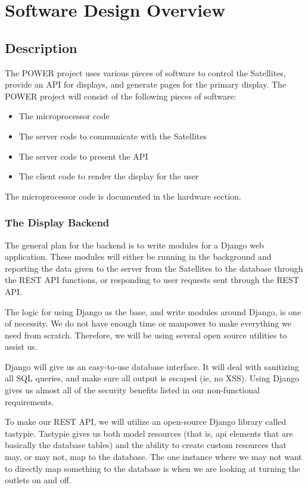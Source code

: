 
\chapter{Software Design Overview}

\section{Description}

The POWER project uses various pieces of software to control the Satellites, provide an API for displays, and generate pages for the primary display.
The POWER project will consist of the following pieces of software:
\begin{itemize}
 \item The microprocessor code
 \item The server code to communicate with the Satellites
 \item The server code to present the API
 \item The client code to render the display for the user
\end{itemize}

The microprocessor code is documented in the hardware section.

\subsection{The Display Backend}

The general plan for the backend is to write modules for a Django web application.
These modules will either be running in the background and reporting the data given to the server from the Satellites to the database through the REST API functions, or responding to user requests sent through the REST API.

The logic for using Django as the base, and write modules around Django, is one of necessity.
We do not have enough time or manpower to make everything we need from scratch.
Therefore, we will be using several open source utilities to assist us.


Django will give us an easy-to-use database interface.
It will deal with sanitizing all SQL queries, and make sure all output is escaped (ie, no XSS).
Using Django gives us almost all of the security benefits listed in our non-functional requirements.

To make our REST API, we will utilize an open-source Django library called tastypie.
Tastypie gives us both model resources (that is, api elements that are basically the database tables) and the ability to create custom resources that may, or may not, map to the database.
The one instance where we may not want to directly map something to the database is when we are looking at turning the outlets on and off.

